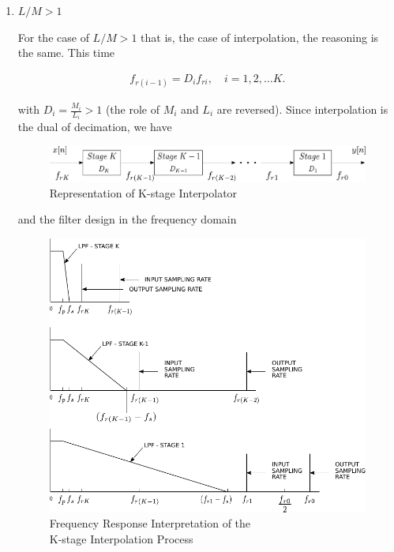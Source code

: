 \begin{itemize}
\begin{enumerate}
 
	 	\item $L/M > 1$
	 	
	 	For the case of $L/M > 1$ that is, the case of interpolation, the reasoning is the same. This time
	 	
	 	\begin{align}
	 		f_{r(i-1)} = D_i f_{ri} , \quad i = 1,2,\dots K.
	 	\end{align}
	 	
	 	with  $D_i = \frac{M_i}{L_i} > 1$ (the role of $M_i$ and $L_i$ are reversed). Since interpolation is the dual of decimation, we have 
	 	
	 	\begin{figure}[ht!]
	 		\centering
	 		\includegraphics[scale = 0.6]{multistage_down_1.pdf}
	 		\caption{Representation of K-stage Interpolator}\label{Figure 3.15}
	 	\end{figure}
	 	
	 	and the filter design in the frequency domain
	 	
	 	\begin{figure}[ht!]
	 		\centering
	 		\hspace*{2mm}
	 		\includegraphics[scale = 0.77]{multistage_down_2.pdf}
	 		\caption{Frequency Response Interpretation of the \\ K-stage Interpolation Process}\label{Figure 3.16}
	 	\end{figure}
	 	

\end{enumerate}
\end{itemize}
